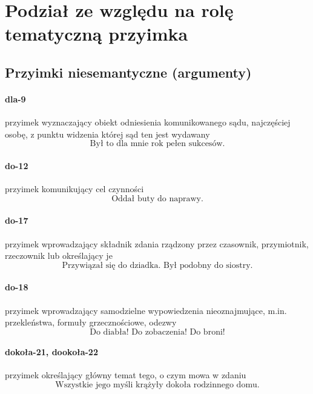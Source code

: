 \documentclass[a4paper, 12pt]{article}
\theoremstyle{remark}
\begin{document}
\section{Podział ze względu na rolę tematyczną przyimka} %
\label{sec:podzia_ze_wzgldu_na_rol_tematyczna}

\subsection{Przyimki niesemantyczne (argumenty)} %
\label{sub:argument}
\paragraph{dla-9}\label{prep-9}	przyimek wyznaczający obiekt odniesienia komunikowanego sądu, najczęściej osobę, z punktu widzenia której sąd ten jest wydawany
\begin{equation}
\text{Był to dla mnie rok pełen sukcesów.}
\end{equation}
\paragraph{do-12}\label{prep-12}	przyimek komunikujący cel czynności
\begin{equation}
\text{Oddał buty do naprawy.}
\end{equation}
\paragraph{do-17}\label{prep-17}	przyimek wprowadzający składnik zdania rządzony przez czasownik, przymiotnik, rzeczownik lub określający je
\begin{equation}
\text{Przywiązał się do dziadka. Był podobny do siostry.}
\end{equation}
\paragraph{do-18}\label{prep-18}	przyimek wprowadzający samodzielne wypowiedzenia nieoznajmujące, m.in. przekleństwa, formuły grzecznościowe, odezwy
\begin{equation}
\text{Do diabła! Do zobaczenia! Do broni!}
\end{equation}
\paragraph{dokoła-21, dookoła-22}\label{prep-21}	przyimek określający główny temat tego, o czym mowa w zdaniu
\begin{equation}
\text{Wszystkie jego myśli krążyły dokoła rodzinnego domu.}
\end{equation}
\end{document}
